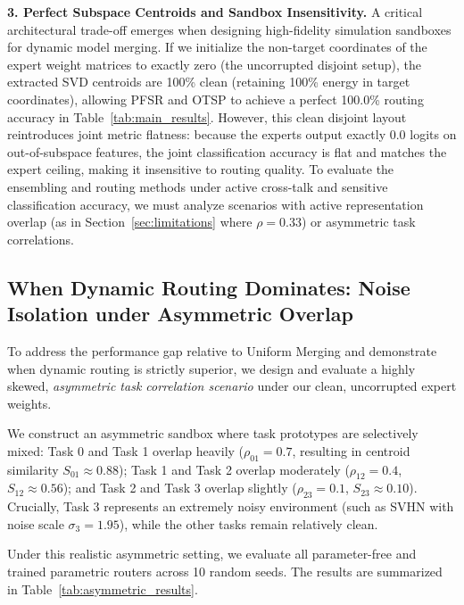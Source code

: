 \textbf{3. Perfect Subspace Centroids and Sandbox Insensitivity.}
A critical architectural trade-off emerges when designing high-fidelity simulation sandboxes for dynamic model merging. If we initialize the non-target coordinates of the expert weight matrices to exactly zero (the uncorrupted disjoint setup), the extracted SVD centroids are 100\% clean (retaining 100\% energy in target coordinates), allowing PFSR and OTSP to achieve a perfect 100.0\% routing accuracy in Table~\ref{tab:main_results}. However, this clean disjoint layout reintroduces joint metric flatness: because the experts output exactly $0.0$ logits on out-of-subspace features, the joint classification accuracy is flat and matches the expert ceiling, making it insensitive to routing quality. To evaluate the ensembling and routing methods under active cross-talk and sensitive classification accuracy, we must analyze scenarios with active representation overlap (as in Section~\ref{sec:limitations} where $\rho = 0.33$) or asymmetric task correlations.

\subsection{When Dynamic Routing Dominates: Noise Isolation under Asymmetric Overlap}
\label{sec:asymmetric_overlap}

To address the performance gap relative to Uniform Merging and demonstrate when dynamic routing is strictly superior, we design and evaluate a highly skewed, \textit{asymmetric task correlation scenario} under our clean, uncorrupted expert weights.

We construct an asymmetric sandbox where task prototypes are selectively mixed: Task 0 and Task 1 overlap heavily ($\rho_{01} = 0.7$, resulting in centroid similarity $S_{01} \approx 0.88$); Task 1 and Task 2 overlap moderately ($\rho_{12} = 0.4$, $S_{12} \approx 0.56$); and Task 2 and Task 3 overlap slightly ($\rho_{23} = 0.1$, $S_{23} \approx 0.10$). Crucially, Task 3 represents an extremely noisy environment (such as SVHN with noise scale $\sigma_3 = 1.95$), while the other tasks remain relatively clean.

Under this realistic asymmetric setting, we evaluate all parameter-free and trained parametric routers across 10 random seeds. The results are summarized in Table~\ref{tab:asymmetric_results}.

